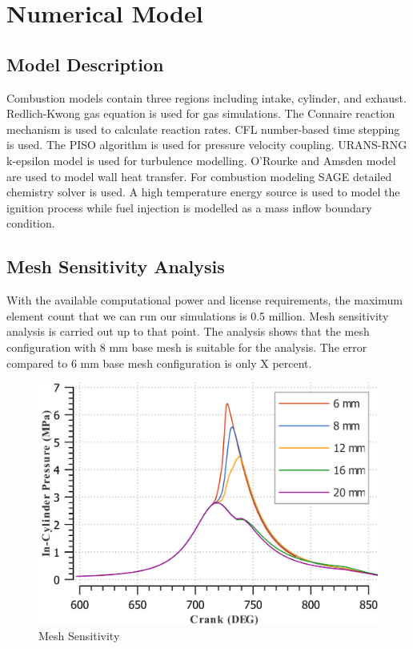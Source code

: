 \documentclass[conference]{IEEEtran}
\begin{document}
\section{Numerical Model}
\subsection{Model Description}
Combustion models contain three regions including intake, cylinder, and exhaust. Redlich-Kwong gas equation is used for gas simulations. The Connaire reaction mechanism is used to calculate reaction rates. CFL number-based time stepping is used. The PISO algorithm is used for pressure velocity coupling. URANS-RNG k-epsilon model is used for turbulence modelling. O’Rourke and Amsden model are used to model wall heat transfer. For combustion modeling SAGE detailed chemistry solver is used. A high temperature energy source is used to model the ignition process while fuel injection is modelled as a mass inflow boundary condition.
\subsection{Mesh Sensitivity Analysis}
With the available computational power and license requirements, the maximum element count that we can run our simulations is 0.5 million. Mesh sensitivity analysis is carried out up to that point. The analysis shows that the mesh configuration with 8 mm base mesh is suitable for the analysis. The error compared to 6 mm base mesh configuration is only X percent.
\begin{figure}[htbp]
    \centerline{\includegraphics{Plots/mesh_sens.png}}
    \caption{Mesh Sensitivity}
    \label{plt_t}
    \end{figure}
\end{document}
